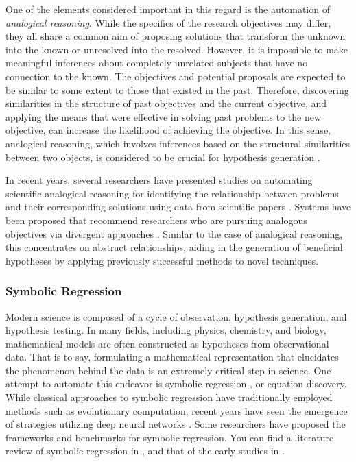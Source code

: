 \documentclass{book}
\begin{document}
One of the elements considered important in this regard is the automation of \textit{analogical reasoning}. While the specifics of the research objectives may differ, they all share a common aim of proposing solutions that transform the unknown into the known or unresolved into the resolved. However, it is impossible to make meaningful inferences about completely unrelated subjects that have no connection to the known. The objectives and potential proposals are expected to be similar to some extent to those that existed in the past. Therefore, discovering similarities in the structure of past objectives and the current objective, and applying the means that were effective in solving past problems to the new objective, can increase the likelihood of achieving the objective. In this sense, analogical reasoning, which involves inferences based on the structural similarities between two objects, is considered to be crucial for hypothesis generation \cite{hesse1965models,thagard_1984,gentner1993shift,holyoak1996mental,dunbar1997scientists,gentner2002analogy}. 

In recent years, several researchers have presented studies on automating scientific analogical reasoning for identifying the relationship between problems and their corresponding solutions using data from scientific papers \cite{kang2022augmenting,chan2018solvent}. 
Systems have been proposed that recommend researchers who are pursuing analogous objectives via divergent approaches \cite{portenoy2022bursting}. Similar to the case of analogical reasoning, this concentrates on abstract relationships, aiding in the generation of beneficial hypotheses by applying previously successful methods to novel techniques.

\subsubsection{Symbolic Regression} 

Modern science is composed of a cycle of observation, hypothesis generation, and hypothesis testing. In many fields, including physics, chemistry, and biology, mathematical models are often constructed as hypotheses from observational data. That is to say, formulating a mathematical representation that elucidates the phenomenon behind the data is an extremely critical step in science. One attempt to automate this endeavor is symbolic regression \cite{makke2022interpretable}, or equation discovery. While classical approaches to symbolic regression have traditionally employed methods such as evolutionary computation, recent years have seen the emergence of strategies utilizing deep neural networks \cite{petersen2019deep,udrescu2020ai,udrescu2020ai2,cranmer2020discovering,kamienny2022end,d2022deep}. Some researchers have proposed the frameworks \cite{landajuela2022unified,keren2023computational} and benchmarks \cite{matsubara2022rethinking} for symbolic regression. You can find a literature review of symbolic regression in \cite{makke2022interpretable}, and that of the early studies in \cite{kramer2023automated}.
\end{document}

